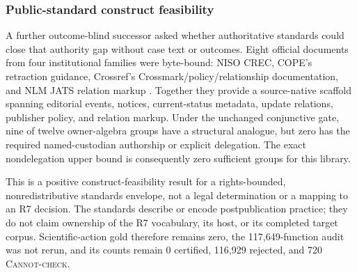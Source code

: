 \subsubsection{Public-standard construct feasibility}
A further outcome-blind successor asked whether authoritative standards could
close that authority gap without case text or outcomes. Eight official
documents from four institutional families were byte-bound: NISO CREC,
COPE's retraction guidance, Crossref's Crossmark/policy/relationship
documentation, and NLM JATS relation markup
\cite{nisoCREC2024,copeRetraction2025,crossrefCrossmark2026,nlmJATS14}.
Together they provide a source-native scaffold spanning editorial events,
notices, current-status metadata, update relations, publisher policy, and
relation markup. Under the unchanged conjunctive gate, nine of twelve
owner-algebra groups have a structural analogue, but zero has the required
named-custodian authorship or explicit delegation. The exact nondelegation
upper bound is consequently zero sufficient groups for this library.

This is a positive construct-feasibility result for a rights-bounded,
nonredistributive standards envelope, not a legal determination or a mapping
to an R7 decision. The standards describe or encode postpublication practice;
they do not claim ownership of the R7 vocabulary, its host, or its completed
target corpus. Scientific-action gold therefore remains zero, the
117,649-function audit was not rerun, and its counts remain 0 certified,
116,929 rejected, and 720 \textsc{Cannot-check}.

